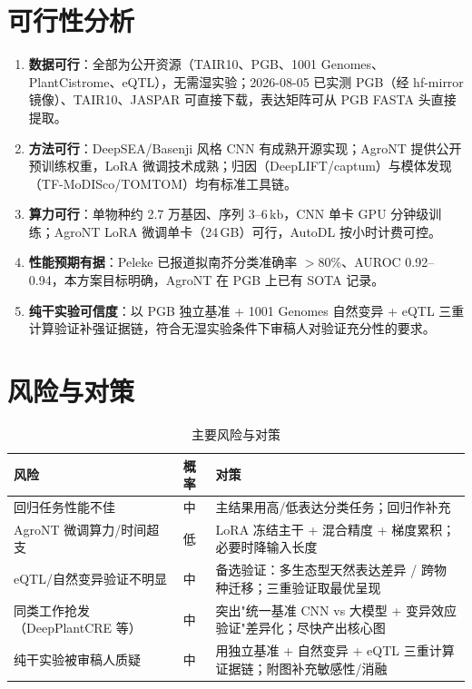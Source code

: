 \documentclass[UTF8,11pt,a4paper]{ctexart}
\begin{document}
\section{可行性分析}
\label{sec:feasibility}

\begin{enumerate}
\item \textbf{数据可行}：全部为公开资源（TAIR10、PGB、1001 Genomes、PlantCistrome、eQTL），无需湿实验；2026-08-05 已实测 PGB（经 hf-mirror 镜像）、TAIR10、JASPAR 可直接下载，表达矩阵可从 PGB FASTA 头直接提取。
\item \textbf{方法可行}：DeepSEA/Basenji 风格 CNN 有成熟开源实现；AgroNT 提供公开预训练权重，LoRA 微调技术成熟\cite{mendoza2024}；归因（DeepLIFT/captum）与模体发现（TF-MoDISco/TOMTOM）均有标准工具链。
\item \textbf{算力可行}：单物种约 2.7 万基因、序列 3--6\,kb，CNN 单卡 GPU 分钟级训练；AgroNT LoRA 微调单卡（24\,GB）可行，AutoDL 按小时计费可控。
\item \textbf{性能预期有据}：Peleke 已报道拟南芥分类准确率 $>$80\%、AUROC 0.92--0.94\cite{peleke2024}，本方案目标明确，AgroNT 在 PGB 上已有 SOTA 记录\cite{mendoza2024}。
\item \textbf{纯干实验可信度}：以 PGB 独立基准 + 1001 Genomes 自然变异 + eQTL 三重计算验证补强证据链，符合无湿实验条件下审稿人对验证充分性的要求。
\end{enumerate}

\section{风险与对策}
\label{sec:risk}

\begin{table}[htbp]
\centering
\caption{主要风险与对策}
\label{tab:risk}
\small
\begin{tabular}{@{}p{5.2cm}p{1.4cm}p{7.6cm}@{}}
\toprule
\textbf{风险} & \textbf{概率} & \textbf{对策} \\
\midrule
回归任务性能不佳 & 中 & 主结果用高/低表达分类任务；回归作补充 \\
AgroNT 微调算力/时间超支 & 低 & LoRA 冻结主干 + 混合精度 + 梯度累积；必要时降输入长度 \\
eQTL/自然变异验证不明显 & 中 & 备选验证：多生态型天然表达差异 / 跨物种迁移；三重验证取最优呈现 \\
同类工作抢发（DeepPlantCRE 等） & 中 & 突出"统一基准 CNN vs 大模型 + 变异效应验证"差异化；尽快产出核心图 \\
纯干实验被审稿人质疑 & 中 & 用独立基准 + 自然变异 + eQTL 三重计算证据链；附图补充敏感性/消融 \\
\bottomrule
\end{tabular}
\end{table}
\end{document}
